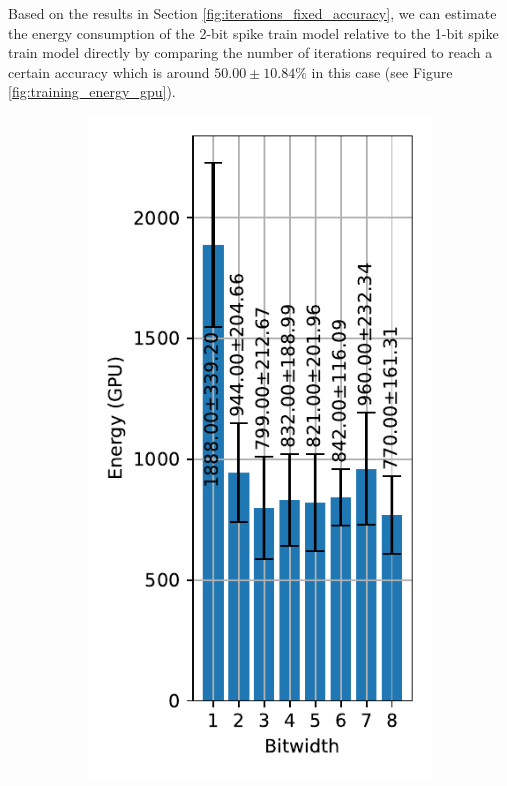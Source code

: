         Based on the results in Section \ref{fig:iterations_fixed_accuracy}, we can estimate the energy consumption of the 2-bit spike train model relative to the 1-bit spike train model directly by comparing the number of iterations required to reach a certain accuracy which is around $50.00\pm10.84\%$ in this case (see Figure \ref{fig:training_energy_gpu}). 
        \begin{figure}[!htpb]
            \centering
            \begin{subfigure}[H]{0.45\textwidth}
                \includegraphics[width=\textwidth]{../standard/FashionMNIST/plots/fashionmnist_train_energy_gpu.pdf}

\end{subfigure}
\end{figure}
